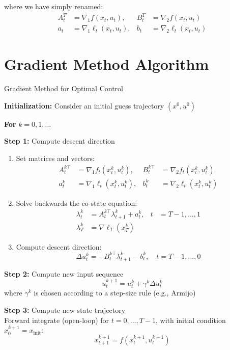 \documentclass[openany]{book}
\theoremstyle{definition}
\theoremstyle{remark}
\begin{document}
where we have simply renamed:
\begin{align*}
    A_t^T &= \nabla_1f(x_t, u_t), & B_t^T &= \nabla_2f(x_t, u_t)\\
    a_t &= \nabla_1\ell_t(x_t, u_t), & b_t &= \nabla_2\ell_t(x_t, u_t)
\end{align*}

\newpage

\section{Gradient Method Algorithm}
\begin{algorithm}
\caption{Gradient Method for Optimal Control}

\textbf{Initialization:} Consider an initial guess trajectory $(x^0, u^0)$

\vspace{0.5cm}

\textbf{For} $k = 0,1,\ldots$

\vspace{0.5cm}

\textbf{Step 1:} Compute descent direction
\begin{enumerate}
    \item Set matrices and vectors:
        \begin{align*}
            A_t^{k\top} &= \nabla_1f_t(x_t^k, u_t^k), & B_t^{k\top} &= \nabla_2f_t(x_t^k, u_t^k)\\
            a_t^k &= \nabla_1\ell_t(x_t^k, u_t^k), & b_t^k &= \nabla_2\ell_t(x_t^k, u_t^k)
        \end{align*}
        
    \item Solve backwards the co-state equation:
        \begin{align*}
            \lambda_t^k &= A_t^{k\top}\lambda_{t+1}^k + a_t^k, & t &= T-1,\ldots,1\\
            \lambda_T^k &= \nabla\ell_T(x_T^k)
        \end{align*}
        
    \item Compute descent direction:
        \[
            \Delta u_t^k = -B_t^{k\top}\lambda_{t+1}^k - b_t^k, \quad t = T-1,\ldots,0
        \]
\end{enumerate}

\vspace{0.5cm}

\textbf{Step 2:} Compute new input sequence
\[
    u_t^{k+1} = u_t^k + \gamma^k\Delta u_t^k
\]
where $\gamma^k$ is chosen according to a step-size rule (e.g., Armijo)

\vspace{0.5cm}

\textbf{Step 3:} Compute new state trajectory\\
Forward integrate (open-loop) for $t = 0,\ldots,T-1$, with initial condition $x_0^{k+1} = x_{\text{init}}$:
\[
    x_{t+1}^{k+1} = f(x_t^{k+1}, u_t^{k+1})
\]
\end{algorithm}
\end{document}
